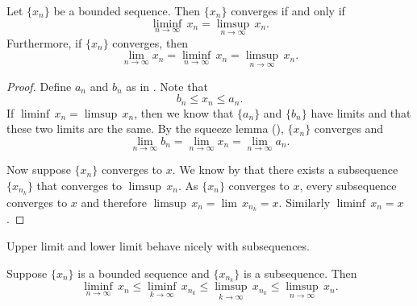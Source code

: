 \documentclass[12pt]{book}
\begin{document}
\begin{thm} \label{liminfsupconv:thm}
Let $\{ x_n \}$ be a bounded sequence.
Then $\{ x_n \}$ converges
if and only if
\begin{equation*}
\liminf_{n\to \infty} \, x_n = 
\limsup_{n\to \infty} \, x_n.
\end{equation*}
Furthermore, if $\{ x_n \}$ converges, then
\begin{equation*}
\lim_{n\to \infty} x_n = 
\liminf_{n\to \infty} \, x_n = 
\limsup_{n\to \infty} \, x_n.
\end{equation*}
\end{thm}

\begin{proof}
Define $a_n$ and $b_n$ as in .
Note that
\begin{equation*}
b_n \leq x_n \leq a_n .
\end{equation*}
If 
$\liminf \, x_n = \limsup \, x_n$, then we know that $\{ a_n \}$ and $\{ b_n \}$
have limits and that these two limits are the same.
By the squeeze lemma
(), $\{ x_n \}$ converges and
\begin{equation*}
\lim_{n\to \infty} b_n
=
\lim_{n\to \infty} x_n
=
\lim_{n\to \infty} a_n .
\end{equation*}

Now suppose $\{ x_n \}$ converges to $x$.
We know by
that there exists a subsequence $\{ x_{n_k} \}$
that converges to $\limsup \, x_n$.
As $\{ x_n \}$ converges to $x$,
every subsequence converges to $x$ and
therefore $\limsup \, x_n = \lim\, x_{n_k} = x$.
Similarly $\liminf \, x_n = x$.
\end{proof}

Upper limit and lower limit behave nicely
with subsequences.

\begin{prop} \label{prop:subseqslimsupinf}
Suppose $\{ x_n \}$ is a bounded sequence and
$\{ x_{n_k} \}$ is a subsequence.
Then
\begin{equation*}
\liminf_{n\to\infty} \, x_n \leq
\liminf_{k\to\infty} \, x_{n_k} \leq
\limsup_{k\to\infty} \, x_{n_k} \leq
\limsup_{n\to\infty} \, x_n .
\end{equation*}
\end{prop}
\end{document}
